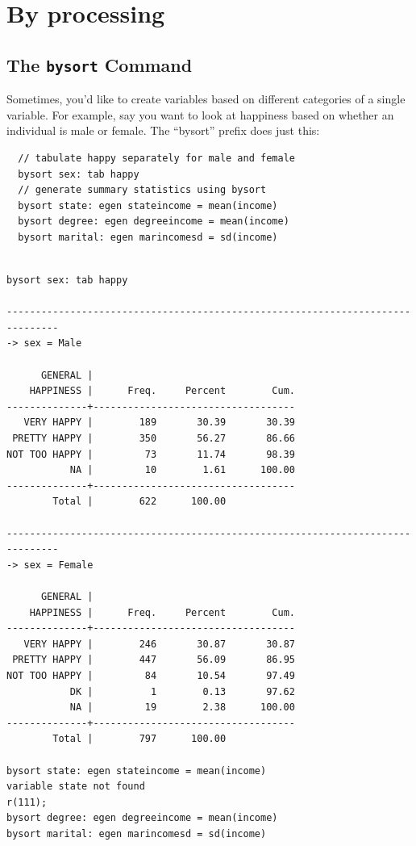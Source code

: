 \documentclass[]{book}
\begin{document}
\section{By processing}\label{by-processing}

\subsection{\texorpdfstring{The \texttt{bysort}
Command}{The bysort Command}}\label{the-bysort-command}

Sometimes, you'd like to create variables based on different categories
of a single variable. For example, say you want to look at happiness
based on whether an individual is male or female. The ``bysort'' prefix
does just this:

\begin{verbatim}
  // tabulate happy separately for male and female 
  bysort sex: tab happy
  // generate summary statistics using bysort 
  bysort state: egen stateincome = mean(income)
  bysort degree: egen degreeincome = mean(income)
  bysort marital: egen marincomesd = sd(income)
\end{verbatim}

\begin{verbatim}

bysort sex: tab happy

-------------------------------------------------------------------------------
-> sex = Male

      GENERAL |
    HAPPINESS |      Freq.     Percent        Cum.
--------------+-----------------------------------
   VERY HAPPY |        189       30.39       30.39
 PRETTY HAPPY |        350       56.27       86.66
NOT TOO HAPPY |         73       11.74       98.39
           NA |         10        1.61      100.00
--------------+-----------------------------------
        Total |        622      100.00

-------------------------------------------------------------------------------
-> sex = Female

      GENERAL |
    HAPPINESS |      Freq.     Percent        Cum.
--------------+-----------------------------------
   VERY HAPPY |        246       30.87       30.87
 PRETTY HAPPY |        447       56.09       86.95
NOT TOO HAPPY |         84       10.54       97.49
           DK |          1        0.13       97.62
           NA |         19        2.38      100.00
--------------+-----------------------------------
        Total |        797      100.00

bysort state: egen stateincome = mean(income)
variable state not found
r(111);
bysort degree: egen degreeincome = mean(income)
bysort marital: egen marincomesd = sd(income)
\end{verbatim}
\end{document}
